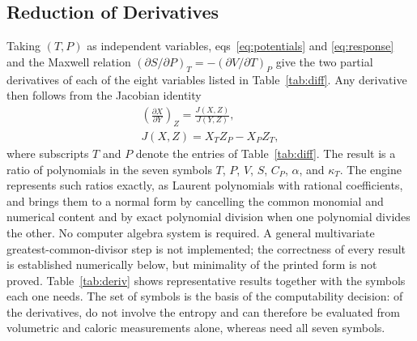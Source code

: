 \documentclass[journal=iecred,manuscript=article,layout=twocolumn]{achemso}
\newcommand{\pd}[3]{\left(\frac{\partial #1}{\partial #2}\right)_{\!#3}}
\begin{document}
\subsection{Reduction of Derivatives}

Taking $(T,P)$ as independent variables, eqs~\ref{eq:potentials} and
\ref{eq:response} and the Maxwell relation
$(\partial S/\partial P)_T = -(\partial V/\partial T)_P$ give the two partial
derivatives of each of the eight variables listed in
Table~\ref{tab:diff}. Any derivative then follows from the Jacobian
identity\cite{Shaw1935}
\begin{equation}
\begin{gathered}
\pd{X}{Y}{Z} = \frac{J(X,Z)}{J(Y,Z)},\\
J(X,Z) = X_T Z_P - X_P Z_T ,
\end{gathered}
\label{eq:jacobian}
\end{equation}
where subscripts $T$ and $P$ denote the entries of Table~\ref{tab:diff}. The
result is a ratio of polynomials in the seven symbols $T$, $P$, $V$, $S$, $C_P$,
$\alpha$, and $\kappa_T$. The engine represents such ratios exactly, as Laurent
polynomials with rational coefficients, and brings them to a normal form by
cancelling the common monomial and numerical content and by exact polynomial
division when one polynomial divides the other. No computer algebra system is
required. A general multivariate greatest-common-divisor step is not
implemented; the correctness of every result is established numerically below,
but minimality of the printed form is not proved. Table~\ref{tab:deriv} shows
representative results together with the symbols each one needs. The set of
symbols is the basis of the computability decision: of the \NDerivTotal{}
derivatives, \NDerivNoS{} do not involve the entropy and can therefore be
evaluated from volumetric and caloric measurements alone, whereas
\NDerivAllSeven{} need all seven symbols.

\begin{table}
\caption{Partial Derivatives in the $(T,P)$ Plane Used in eq~\ref{eq:jacobian}}
\label{tab:diff}
\small
{}
\end{table}

\begin{table}
\caption{Selected Reduced Derivatives Produced by the Engine and the Symbols
Each Requires}
\label{tab:deriv}
\small
{}
\end{table}
\end{document}
